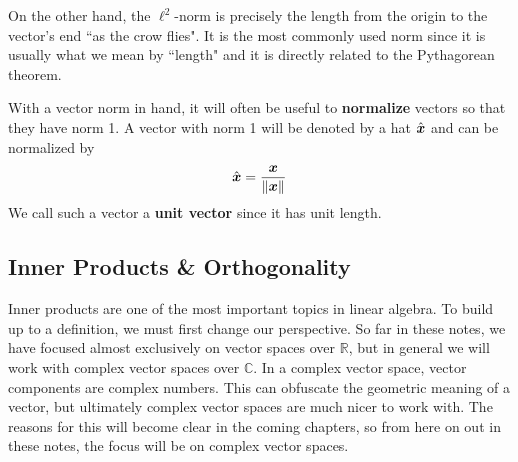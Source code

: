 \documentclass[onecolumn]{gwclass}
\begin{document}
On the other hand, the $\ell^2$-norm is precisely the length from the origin to the vector's end ``as the crow flies". It is the most commonly used norm since it is usually what we mean by ``length" and it is directly related to the Pythagorean theorem.

With a vector norm in hand, it will often be useful to \textbf{normalize} vectors so that they have norm 1. A vector with norm 1 will be denoted by a hat $\hat{\boldsymbol{x}}$ and can be normalized by
$$ \hat{\boldsymbol{x}} = \frac{\boldsymbol{x}}{\|\boldsymbol{x}\|} $$
We call such a vector a \textbf{unit vector} since it has unit length.





\subsection{Inner Products \& Orthogonality}

Inner products are one of the most important topics in linear algebra. To build up to a definition, we must first change our perspective. So far in these notes, we have focused almost exclusively on vector spaces over $\mathbb{R}$, but in general we will work with complex vector spaces over $\mathbb{C}$. In a complex vector space, vector components are complex numbers. This can obfuscate the geometric meaning of a vector, but ultimately complex vector spaces are much nicer to work with. The reasons for this will become clear in the coming chapters, so from here on out in these notes, the focus will be on complex vector spaces. 
\end{document}
